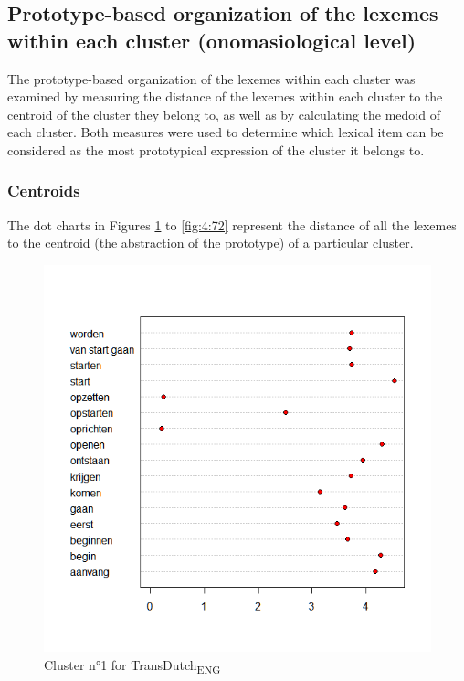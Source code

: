 \subsection{Prototype-based organization of the lexemes within each cluster (onomasiological level)}
\label{sec:4.3.3}  
The prototype-based organization of the lexemes within each cluster was examined by measuring the distance of the lexemes within each cluster to the centroid of the cluster they belong to, as well as by calculating the medoid of each cluster. Both measures were used to determine which lexical item can be considered as the most prototypical expression of the cluster it belongs to.

\subsubsection{Centroids}
\label{sec:4.3.3.1}  
The dot charts in Figures \ref{fig:4:67} to \ref{fig:4:72} represent the distance of all the lexemes to the centroid (the abstraction of the prototype) of a particular cluster.

\begin{figure}
\includegraphics[height=.4\textheight]{figures/Vandevoorde2-img69.png}
\caption{\label{fig:4:67}  Cluster n°1 for TransDutch\textsubscript{ENG}}
\end{figure}

